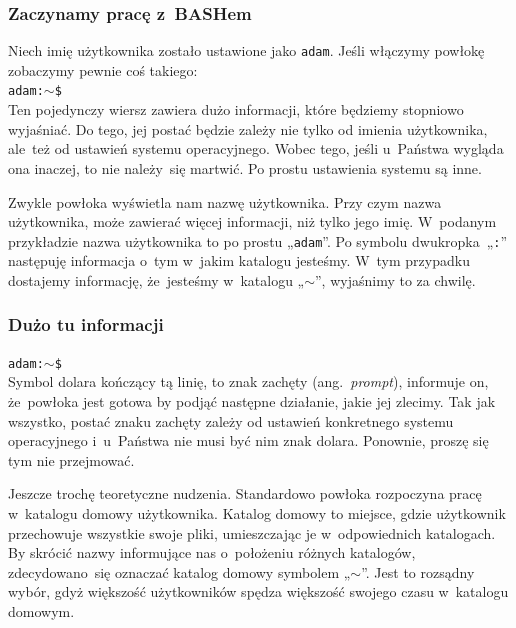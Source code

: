 \documentclass[10pt,t]{beamer}
\begin{document}
\begin{frame}
  \frametitle{Zaczynamy pracę z~BASHem}


  Niech imię użytkownika zostało ustawione jako \texttt{adam}. Jeśli
  włączymy powłokę zobaczymy pewnie coś takiego: \\
  \texttt{adam:$\sim$\$} \\
  Ten pojedynczy wiersz zawiera dużo informacji, które będziemy stopniowo
  wyjaśniać. Do tego, jej postać będzie zależy nie tylko od imienia
  użytkownika, ale~też od ustawień systemu operacyjnego. Wobec tego, jeśli
  u~Państwa wygląda ona inaczej, to nie należy~się martwić. Po prostu
  ustawienia systemu są inne.

  Zwykle powłoka wyświetla nam nazwę użytkownika. Przy czym nazwa
  użytkownika, może zawierać więcej informacji, niż tylko jego imię.
  W~podanym przykładzie nazwa użytkownika to po prostu „\texttt{adam}”.
  Po symbolu dwukropka~„\texttt{:}” następuję informacja o~tym w~jakim
  katalogu jesteśmy. W~tym przypadku dostajemy informację, że~jesteśmy
  w~katalogu „$\sim$”, wyjaśnimy to za chwilę.

\end{frame}





\begin{frame}
  \frametitle{Dużo tu informacji}


  \texttt{adam:$\sim$\$} \\
  Symbol dolara kończący tą linię, to znak zachęty (ang.~\textit{prompt}),
  informuje on, że~powłoka jest gotowa by podjąć następne działanie, jakie
  jej zlecimy. Tak jak wszystko, postać znaku zachęty zależy od ustawień
  konkretnego systemu operacyjnego i~u~Państwa nie musi być nim znak dolara.
  Ponownie, proszę się tym nie przejmować.

  Jeszcze trochę teoretyczne nudzenia. Standardowo powłoka rozpoczyna pracę
  w~katalogu domowy użytkownika. Katalog domowy to miejsce, gdzie użytkownik
  przechowuje wszystkie swoje pliki, umieszczając je w~odpowiednich
  katalogach. By skrócić nazwy informujące nas o~położeniu różnych
  katalogów, zdecydowano~się oznaczać katalog domowy symbolem „$\sim$”. Jest
  to rozsądny wybór, gdyż większość użytkowników spędza większość swojego
  czasu w~katalogu domowym.

\end{frame}
\end{document}
